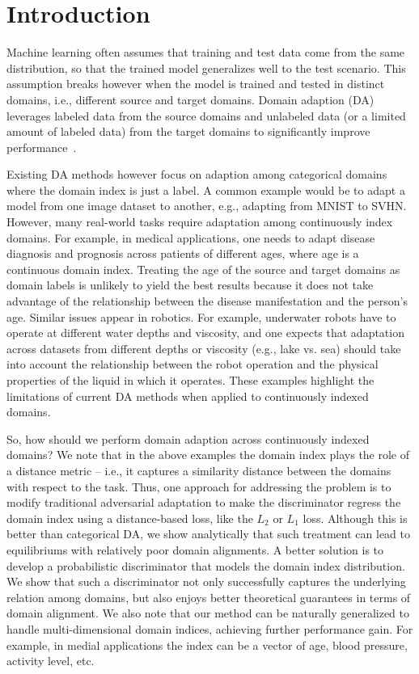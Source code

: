 \documentclass{article}
\begin{document}
 \section{Introduction}
Machine learning often assumes that training and test data come from the same distribution, so that the trained model generalizes well to the test scenario. This assumption breaks however when the model is trained and tested in distinct domains, i.e., different source and target domains.  Domain adaption (DA) leverages labeled data from the source domains and unlabeled data (or a limited amount of labeled data) from the target domains to significantly improve performance~\cite{bendavid,DANN,ADDA,MDD}.

Existing DA methods however focus on adaption among categorical domains where the domain index is just a label.  A common example would be to adapt a model from one image dataset to another, e.g., adapting from MNIST to SVHN. However, many real-world tasks require adaptation among continuously index domains. For example, in medical applications, one needs to adapt disease diagnosis and prognosis across patients of different ages, where age is a continuous domain index. Treating the age of the source and target domains as domain labels is unlikely to yield the best results because it does not take advantage of the relationship between the disease manifestation and the person's age. Similar issues appear in robotics. For example, underwater robots have to operate at different water depths and viscosity, and one expects that adaptation across datasets from different depths or viscosity (e.g., lake vs. sea) should take into account  the relationship between the robot operation and the physical properties of the liquid in which it operates. These examples highlight the limitations of current DA methods when applied to continuously indexed domains.  

So, how should we perform domain adaption across continuously indexed domains? We note that in the above examples the domain index plays the role of a distance metric -- i.e., it captures a similarity distance between the domains with respect to the task. Thus, one approach for addressing the problem is to modify traditional adversarial adaptation to make the discriminator regress the domain index using a distance-based loss, like the $L_2$ or $L_1$ loss. Although this is better than categorical DA, we show analytically that such treatment can lead to equilibriums with relatively poor domain alignments.  A better solution is to develop a probabilistic discriminator that models the domain index distribution. We show that such a discriminator not only successfully captures the underlying relation among domains, but also enjoys better theoretical guarantees in terms of domain alignment. 
We also note that our method can be naturally generalized to handle multi-dimensional domain indices, achieving further performance gain. For example, in medial applications the index can be a vector of age, blood pressure, activity level, etc. 
\end{document}
